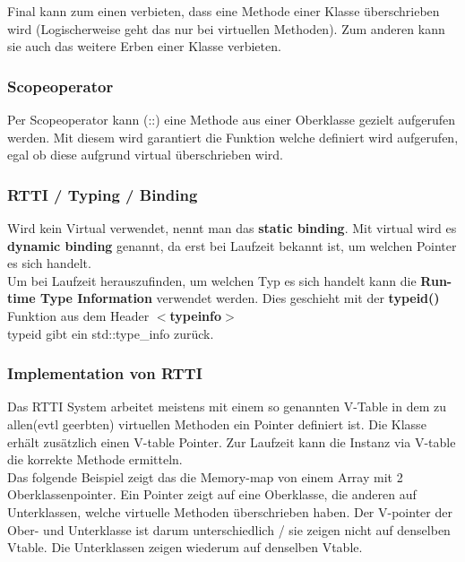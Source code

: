Final kann zum einen verbieten, dass eine Methode einer Klasse überschrieben wird
(Logischerweise geht das nur bei virtuellen Methoden). 
Zum anderen kann sie auch das weitere Erben einer Klasse verbieten. 

\subsubsection{Scopeoperator}

Per Scopeoperator kann (::) eine Methode aus einer Oberklasse gezielt aufgerufen werden. 
Mit diesem wird garantiert die Funktion welche definiert wird aufgerufen, egal ob diese aufgrund virtual überschrieben wird. 



\subsubsection{RTTI / Typing / Binding}

Wird kein Virtual verwendet, nennt man das \textbf{static binding}. 
Mit virtual wird es \textbf{dynamic binding} genannt, da erst bei Laufzeit bekannt ist, um welchen Pointer es sich handelt.\\
Um bei Laufzeit herauszufinden, um welchen Typ es sich handelt kann die \textbf{Run-time Type Information} verwendet werden. 
Dies geschieht mit der \textbf{typeid()} Funktion aus dem Header \textbf{$<$typeinfo$>$}\\
typeid gibt ein std::type\_info zurück. 



\subsubsection{Implementation von RTTI}

Das RTTI System arbeitet meistens mit einem so genannten V-Table in dem zu allen(evtl geerbten) virtuellen Methoden ein Pointer definiert ist. 
Die Klasse erhält zusätzlich einen V-table Pointer. 
Zur Laufzeit kann die Instanz via V-table die korrekte Methode ermitteln.\\

Das folgende Beispiel zeigt das die Memory-map von einem Array mit 2 Oberklassenpointer. 
Ein Pointer zeigt auf eine Oberklasse, die anderen auf Unterklassen, welche virtuelle Methoden überschrieben haben. 
Der V-pointer der Ober- und Unterklasse ist darum unterschiedlich / sie zeigen nicht auf denselben Vtable. 
Die Unterklassen zeigen wiederum auf denselben Vtable.  

